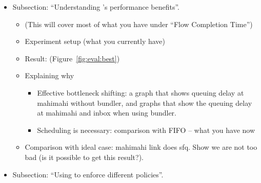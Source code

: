 \begin{itemize}
    \item Subsection: ``Understanding \name's performance benefits''. 
    \begin{itemize}
        \item (This will cover most of what you have under ``Flow Completion Time'')
        \item Experiment setup (what you currently have)
        \item Result: (Figure~\ref{fig:eval:best})
        \item Explaining why
        \begin{itemize}
            \item Effective bottleneck shifting: a graph that shows queuing delay at mahimahi without bundler, and graphs that show the queuing delay at mahimahi and inbox when using bundler. 
            \item Scheduling is necessary: comparison with FIFO -- what you have now
        \end{itemize}
        \item Comparison with ideal case: mahimahi link does sfq. Show we are not too bad (is it possible to get this result?). 
    \end{itemize}
    \item Subsection: ``Using \name to enforce different policies''.
    

\end{itemize}
